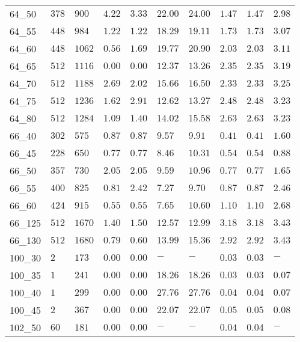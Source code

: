 \begin{center}
\begin{table}[]
\begin{adjustwidth}{-0.4in}{-1in}
\begin{tabular}{|lll|l|l|ll|lll|}
64\_50  & $378   $& $900 $ & $4.22$ & $3.33$   & $22.00$  & $24.00$ & $1.47$ & $1.47$ & $2.98$ \\
64\_55  & $448   $& $984 $ & $1.22$ & $1.22$   & $18.29$  & $19.11$ & $1.73$ & $1.73$ & $3.07$ \\
64\_60  & $448   $& $1062$ & $0.56$ & $1.69$   & $19.77$  & $20.90$ & $2.03$ & $2.03$ & $3.11$ \\
64\_65  & $512   $& $1116$ & $\bm{0.00}$ & $\bm{0.00}$   & $12.37$  & $13.26$ & $2.35$ & $2.35$ & $3.19$ \\
64\_70  & $512   $& $1188$ & $2.69$ & $2.02$   & $15.66$  & $16.50$ & $2.33$ & $2.33$ & $3.25$ \\
64\_75  & $512   $& $1236$ & $1.62$ & $2.91$   & $12.62$  & $13.27$ & $2.48$ & $2.48$ & $3.23$ \\
64\_80  & $512   $& $1284$ & $1.09$ & $1.40$   & $14.02$  & $15.58$ & $2.63$ & $2.63$ & $3.23$ \\
\hline
66\_40  & $302   $& $575 $ & $0.87$ & $0.87$   & $9.57 $  & $9.91$  & $0.41$ & $0.41$ & $1.60$ \\
66\_45  & $228   $& $650 $ & $0.77$ & $0.77$   & $8.46 $  & $10.31$ & $0.54$ & $0.54$ & $0.88$ \\
66\_50  & $357   $& $730 $ & $2.05$ & $2.05$   & $9.59 $  & $10.96$ & $0.77$ & $0.77$ & $1.65$ \\
66\_55  & $400   $& $825 $ & $0.81$ & $2.42$   & $7.27 $  & $9.70$  & $0.87$ & $0.87$ & $2.46$ \\
66\_60  & $424   $& $915 $ & $0.55$ & $0.55$   & $7.65 $  & $10.60$ & $1.10$ & $1.10$ & $2.68$ \\
66\_125 & $512   $& $1670$ & $1.40$ & $1.50$   & $12.57$  & $12.99$ & $3.18$ & $3.18$ & $3.43$ \\
66\_130 & $512   $& $1680$ & $0.79$ & $0.60$   & $13.99$  & $15.36$ & $2.92$ & $2.92$ & $3.43$ \\
\hline
100\_30 & $2     $& $173 $ & $\bm{0.00}$ & $\bm{0.00}$   & $-    $  & $-$     & $0.03$ & $0.03$ & $-   $ \\
100\_35 & $1     $& $241 $ & $\bm{0.00}$ & $\bm{0.00}$   & $18.26$  & $18.26$ & $0.03$ & $0.03$ & $0.07$ \\
100\_40 & $1     $& $299 $ & $\bm{0.00}$ & $\bm{0.00}$   & $27.76$  & $27.76$ & $0.04$ & $0.04$ & $0.07$ \\
100\_45 & $2     $& $367 $ & $\bm{0.00}$ & $\bm{0.00}$   & $22.07$  & $22.07$ & $0.05$ & $0.05$ & $0.08$ \\
\hline
102\_50 & $60    $& $181 $ & $\bm{0.00}$ & $\bm{0.00}$   & $-    $  & $-$     & $0.04$ & $0.04$ & $-   $ \\

\end{tabular}
\end{adjustwidth}
\end{table}
\end{center}
